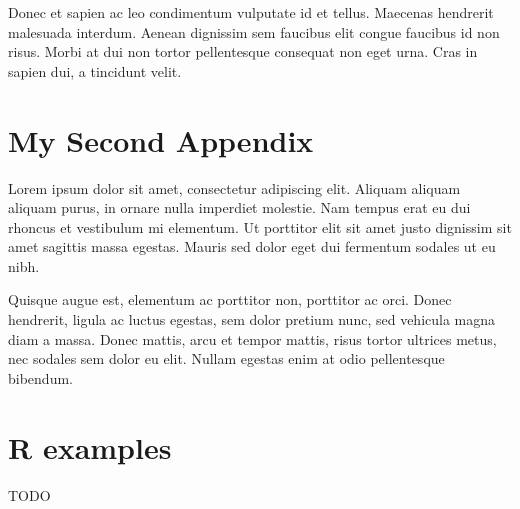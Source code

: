 Donec et sapien ac leo condimentum vulputate id et tellus. Maecenas hendrerit malesuada interdum. Aenean dignissim sem faucibus elit congue faucibus id non risus. Morbi at dui non tortor pellentesque consequat non eget urna. Cras in sapien dui, a tincidunt velit.

\clearpage %
\chapter{My Second Appendix}\label{appx:second}

Lorem ipsum dolor sit amet, consectetur adipiscing elit. Aliquam aliquam aliquam purus, in ornare nulla imperdiet molestie. Nam tempus erat eu dui rhoncus et vestibulum mi elementum. Ut porttitor elit sit amet justo dignissim sit amet sagittis massa egestas. Mauris sed dolor eget dui fermentum sodales ut eu nibh.

Quisque augue est, elementum ac porttitor non, porttitor ac orci. Donec hendrerit, ligula ac luctus egestas, sem dolor pretium nunc, sed vehicula magna diam a massa. Donec mattis, arcu et tempor mattis, risus tortor ultrices metus, nec sodales sem dolor eu elit. Nullam egestas enim at odio pellentesque bibendum. 

\clearpage
{}
\chapter{R examples}
TODO

